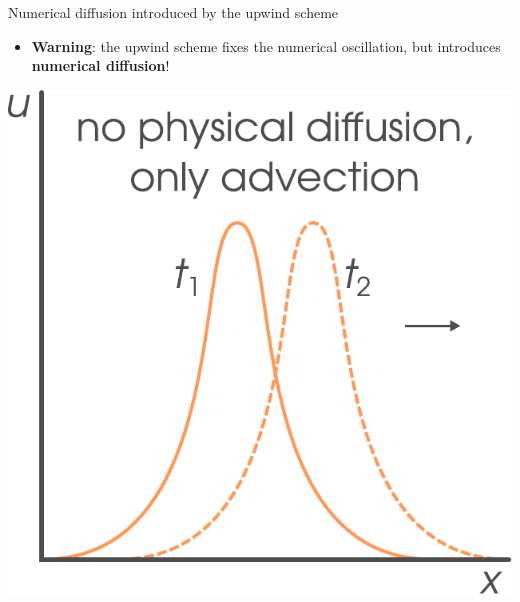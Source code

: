 \begin{frame}{Numerical diffusion introduced by the upwind scheme}
\begin{itemize}
\item {\bf Warning}: the upwind scheme fixes the numerical oscillation, but introduces
\alert{\bf numerical diffusion}!
\end{itemize}
\lcol
\begin{center}
\includegraphics[height=0.6\textheight]{figures/reactive-transport//numerical-diffusion-illustration-1}
\par\end{center}


\end{frame}
